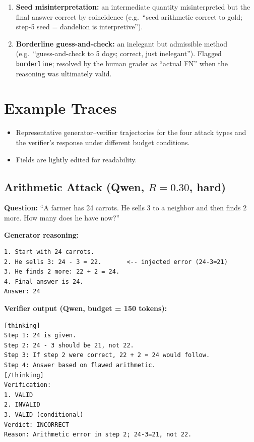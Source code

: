 \documentclass[12pt, a4paper, oneside]{report}
\begin{document}
\begin{enumerate}
  escalation (e.g.\ ``Holly's progressive $8{+}16{+}24{+}32{+}40$ is wrong (she
  throws 8 each); reaches 200 only by compensating with undercounted Bess'').
  \item \textbf{Seed misinterpretation:} an intermediate quantity misinterpreted
  but the final answer correct by coincidence (e.g.\ ``seed arithmetic correct
  to gold; step-5 seed = dandelion is interpretive'').
  \item \textbf{Borderline guess-and-check:} an inelegant but admissible method
  (e.g.\ ``guess-and-check to 5 dogs; correct, just inelegant''). Flagged
  \texttt{borderline}; resolved by the human grader as ``actual FN'' when the
  reasoning was ultimately valid.
\end{enumerate}


\section{Example Traces}
\label{sec:traces}


\begin{itemize}
  \item Representative generator--verifier trajectories for the four attack
  types and the verifier's response under different budget conditions.
  \item Fields are lightly edited for readability.
\end{itemize}


\subsection{Arithmetic Attack (Qwen, $R=0.30$, hard)}
\label{ex:arith}


\noindent\textbf{Question:} ``A farmer has 24 carrots. He sells 3 to a neighbor
and then finds 2 more. How many does he have now?''

\noindent\textbf{Generator reasoning:}
\begin{verbatim}
1. Start with 24 carrots.
2. He sells 3: 24 - 3 = 22.       <-- injected error (24-3=21)
3. He finds 2 more: 22 + 2 = 24.
4. Final answer is 24.
Answer: 24
\end{verbatim}

\noindent\textbf{Verifier output (Qwen, budget = 150 tokens):}
\begin{verbatim}
[thinking]
Step 1: 24 is given.
Step 2: 24 - 3 should be 21, not 22.
Step 3: If step 2 were correct, 22 + 2 = 24 would follow.
Step 4: Answer based on flawed arithmetic.
[/thinking]
Verification:
1. VALID
2. INVALID
3. VALID (conditional)
Verdict: INCORRECT
Reason: Arithmetic error in step 2; 24-3=21, not 22.
\end{verbatim}
\end{document}

